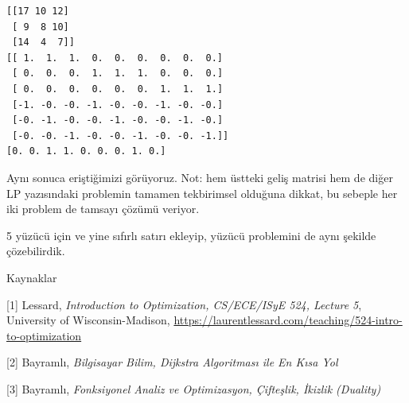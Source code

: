 \documentclass[12pt,fleqn]{article}\usepackage{../../common}
\begin{document}
\begin{verbatim}
[[17 10 12]
 [ 9  8 10]
 [14  4  7]]
[[ 1.  1.  1.  0.  0.  0.  0.  0.  0.]
 [ 0.  0.  0.  1.  1.  1.  0.  0.  0.]
 [ 0.  0.  0.  0.  0.  0.  1.  1.  1.]
 [-1. -0. -0. -1. -0. -0. -1. -0. -0.]
 [-0. -1. -0. -0. -1. -0. -0. -1. -0.]
 [-0. -0. -1. -0. -0. -1. -0. -0. -1.]]
[0. 0. 1. 1. 0. 0. 0. 1. 0.]
\end{verbatim}

Aynı sonuca eriştiğimizi görüyoruz. Not: hem üstteki geliş matrisi hem de
diğer LP yazısındaki problemin tamamen tekbirimsel olduğuna dikkat, bu
sebeple her iki problem de tamsayı çözümü veriyor. 

5 yüzücü için ve yine sıfırlı satırı ekleyip, yüzücü problemini de aynı
şekilde çözebilirdik. 

Kaynaklar

[1] Lessard, {\em Introduction to Optimization, CS/ECE/ISyE 524, Lecture 5}, 
    University of Wisconsin-Madison,
    \url{https://laurentlessard.com/teaching/524-intro-to-optimization}

[2] Bayramlı, {\em Bilgisayar Bilim, Dijkstra Algoritması ile En Kısa Yol}

[3] Bayramlı, {\em Fonksiyonel Analiz ve Optimizasyon, Çifteşlik, İkizlik (Duality)}
\end{document}
